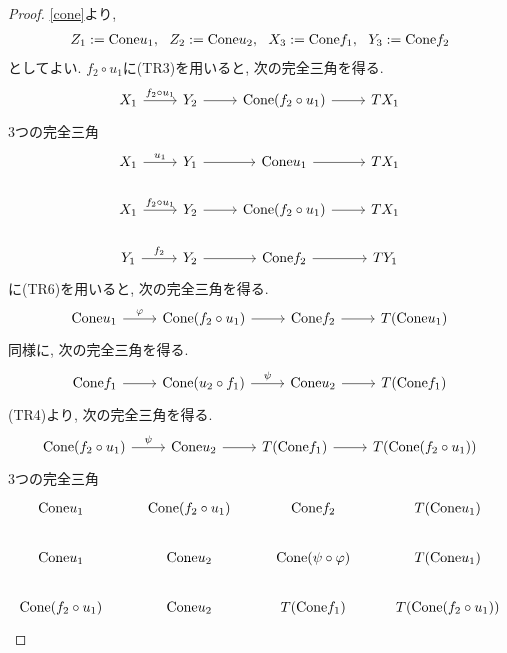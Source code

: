 \documentclass[uplatex, a4paper, 14Q, dvipdfmx]{jsarticle}
\begin{document}
\begin{proof}
  \cref{cone}より, 
  \begin{align*}
    Z_1 := \mathrm{Cone} u_1 ,~~ Z_2 := \mathrm{Cone} u_2 ,~~ X_3 := \mathrm{Cone} f_1 ,~~ Y_3 := \mathrm{Cone} f_2 
  \end{align*}
  としてよい. 
  $f_2 \circ u_1$に(TR3)を用いると, 次の完全三角を得る.  
  \[\begin{tikzcd}
    {X_1} & {Y_2} & {\Cone (f_2 \circ u_1)} & {TX_1}
    \arrow["{f_2 \circ u_1}", from=1-1, to=1-2]
    \arrow[from=1-2, to=1-3]
    \arrow[from=1-3, to=1-4]
  \end{tikzcd}\]
  3つの完全三角
  \[\begin{tikzcd}
    {X_1} & {Y_1} & {\Cone u_1} & {TX_1} \\
    {X_1} & {Y_2} & {\Cone (f_2 \circ u_1)} & {TX_1} \\
    {Y_1} & {Y_2} & {\Cone f_2} & {TY_1}
    \arrow["{u_1}", from=1-1, to=1-2]
    \arrow[from=1-2, to=1-3]
    \arrow[from=1-3, to=1-4]
    \arrow[from=2-2, to=2-3]
    \arrow[from=2-3, to=2-4]
    \arrow["{f_2 \circ u_1}", from=2-1, to=2-2]
    \arrow["{f_2}", from=3-1, to=3-2]
    \arrow[from=3-2, to=3-3]
    \arrow[from=3-3, to=3-4]
  \end{tikzcd}\]
  に(TR6)を用いると, 次の完全三角を得る. 
  \[\begin{tikzcd}
    {\Cone u_1} & {\Cone (f_2 \circ u_1)} & {\Cone f_2} & {T(\Cone u_1)}
    \arrow["\varphi", from=1-1, to=1-2]
    \arrow[from=1-2, to=1-3]
    \arrow[from=1-3, to=1-4]
  \end{tikzcd}\]
  同様に, 次の完全三角を得る.  
  \[\begin{tikzcd}
    {\Cone f_1} & {\Cone (u_2 \circ f_1)} & {\Cone u_2} & {T(\Cone f_1)}
    \arrow[from=1-1, to=1-2]
    \arrow["\psi", from=1-2, to=1-3]
    \arrow[from=1-3, to=1-4]
  \end{tikzcd}\]
  (TR4)より, 次の完全三角を得る. 
  \[\begin{tikzcd}
    {\Cone (f_2 \circ u_1)} & {\Cone u_2} & {T(\Cone f_1)} & {T(\Cone (f_2 \circ u_1))}
    \arrow["\psi", from=1-1, to=1-2]
    \arrow[from=1-2, to=1-3]
    \arrow[from=1-3, to=1-4]
  \end{tikzcd}\]
  3つの完全三角
  \[\begin{tikzcd}
    {\Cone u_1} & {\Cone (f_2 \circ u_1)} & {\Cone f_2} & {T(\Cone u_1)} \\
    {\Cone u_1} & {\Cone u_2} & {\Cone (\psi \circ \varphi)} & {T(\Cone u_1)} \\
    {\Cone (f_2 \circ u_1)} & {\Cone u_2} & {T(\Cone f_1)} & {T(\Cone (f_2 \circ u_1))}

\end{tikzcd}\]
\end{proof}
\end{document}
